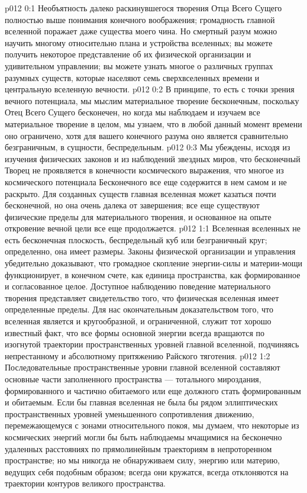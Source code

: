 \vs p012 0:1 Необъятность далеко раскинувшегося творения Отца Всего Сущего полностью выше понимания конечного воображения; громадность главной вселенной поражает даже существа моего чина. Но смертный разум можно научить многому относительно плана и устройства вселенных; вы можете получить некоторое представление об их физической организации и удивительном управлении; вы можете узнать многое о различных группах разумных существ, которые населяют семь сверхвселенных времени и центральную вселенную вечности.
\vs p012 0:2 В принципе, то есть с точки зрения вечного потенциала, мы мыслим материальное творение бесконечным, поскольку Отец Всего Сущего бесконечен, но когда мы наблюдаем и изучаем все материальное творение в целом, мы узнаем, что в любой данный момент времени оно ограничено, хотя для вашего конечного разума оно является сравнительно безграничным, в сущности, беспредельным.
\vs p012 0:3 Мы убеждены, исходя из изучения физических законов и из наблюдений звездных миров, что бесконечный Творец не проявляется в конечности космического выражения, что многое из космического потенциала Бесконечного все еще содержится в нем самом и не раскрыто. Для созданных существ главная вселенная может казаться почти бесконечной, но она очень далека от завершения; все еще существуют физические пределы для материального творения, и основанное на опыте откровение вечной цели все еще продолжается.
\vs p012 1:1 Вселенная вселенных не есть бесконечная плоскость, беспредельный куб или безграничный круг; определенно, она имеет размеры. Законы физической организации и управления убедительно доказывают, что громадное скопление энергии\hyp{}силы и материи\hyp{}мощи функционирует, в конечном счете, как единица пространства, как формированное и согласованное целое. Доступное наблюдению поведение материального творения представляет свидетельство того, что физическая вселенная имеет определенные пределы. Для нас окончательным доказательством того, что вселенная является и кругообразной, и ограниченной, служит тот хорошо известный факт, что все формы основной энергии всегда вращаются по изогнутой траектории пространственных уровней главной вселенной, подчиняясь непрестанному и абсолютному притяжению Райского тяготения.
\vs p012 1:2 Последовательные пространственные уровни главной вселенной составляют основные части заполненного пространства --- тотального мироздания, формированного и частично обитаемого или еще должного стать формированным и обитаемым. Если бы главная вселенная не была бы рядом эллиптических пространственных уровней уменьшенного сопротивления движению, перемежающемуся с зонами относительного покоя, мы думаем, что некоторые из космических энергий могли бы быть наблюдаемы мчащимися на бесконечно удаленных расстояниях по прямолинейным траекториям в непроторенном пространстве; но мы никогда не обнаруживаем силу, энергию или материю, ведущих себя подобным образом; всегда они кружатся, всегда отклоняются на траектории контуров великого пространства.
